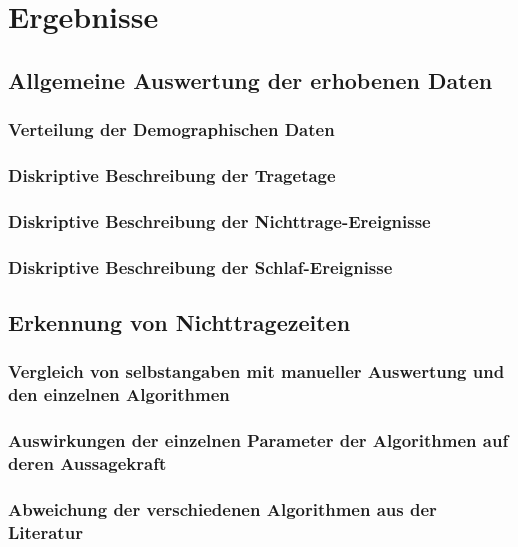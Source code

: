 \chapter{Ergebnisse}

\section{Allgemeine Auswertung der erhobenen Daten}

\subsection{Verteilung der Demographischen Daten}

\subsection{Diskriptive Beschreibung der Tragetage}

\subsection{Diskriptive Beschreibung der Nichttrage-Ereignisse}

\subsection{Diskriptive Beschreibung der Schlaf-Ereignisse}

\section{Erkennung von Nichttragezeiten}

\subsection{Vergleich von selbstangaben mit manueller Auswertung und den einzelnen Algorithmen}

\subsection{Auswirkungen der einzelnen Parameter der Algorithmen auf deren Aussagekraft}

\subsection{Abweichung der verschiedenen Algorithmen aus der Literatur}

